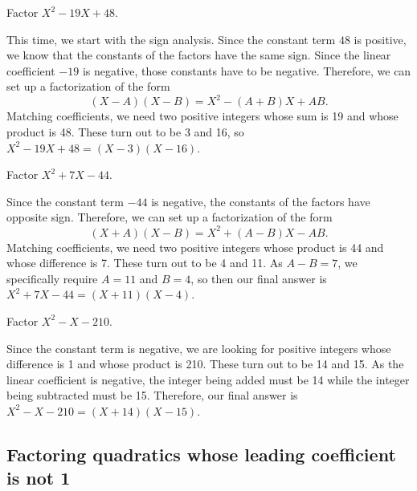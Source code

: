 \begin{example}
Factor $X^2 - 19X + 48$.
\end{example}
\begin{solution}
This time, we start with the sign analysis. Since the constant term $48$ is positive, we know that the constants of the factors have the same sign. Since the linear coefficient $-19$ is negative, those constants have to be negative. Therefore, we can set up a factorization of the form
\begin{equation*}
(X - A)(X - B) = X^2 - (A + B)X + AB.
\end{equation*}
Matching coefficients, we need two positive integers whose sum is 19 and whose product is 48. These turn out to be 3 and 16, so $X^2 - 19X + 48 = \boxed{(X - 3)(X - 16)}$.
\end{solution}

\begin{example}
Factor $X^2 + 7X - 44$.
\end{example}
\begin{solution}
Since the constant term $-44$ is negative, the constants of the factors have opposite sign. Therefore, we can set up a factorization of the form
\begin{equation*}
(X + A)(X - B) = X^2 + (A - B)X - AB.
\end{equation*}
Matching coefficients, we need two positive integers whose product is 44 and whose difference is 7. These turn out to be 4 and 11. As $A - B = 7$, we specifically require $A = 11$ and $B = 4$, so then our final answer is $X^2 + 7X - 44 = \boxed{(X + 11)(X - 4)}$.
\end{solution}

\begin{example}
Factor $X^2 - X - 210$.
\end{example}
\begin{solution}
Since the constant term is negative, we are looking for positive integers whose difference is 1 and whose product is 210. These turn out to be 14 and 15. As the linear coefficient is negative, the integer being added must be 14 while the integer being subtracted must be 15. Therefore, our final answer is $X^2 - X - 210 = \boxed{(X + 14)(X - 15)}$.
\end{solution}


\subsection{Factoring quadratics whose leading coefficient is not 1}

